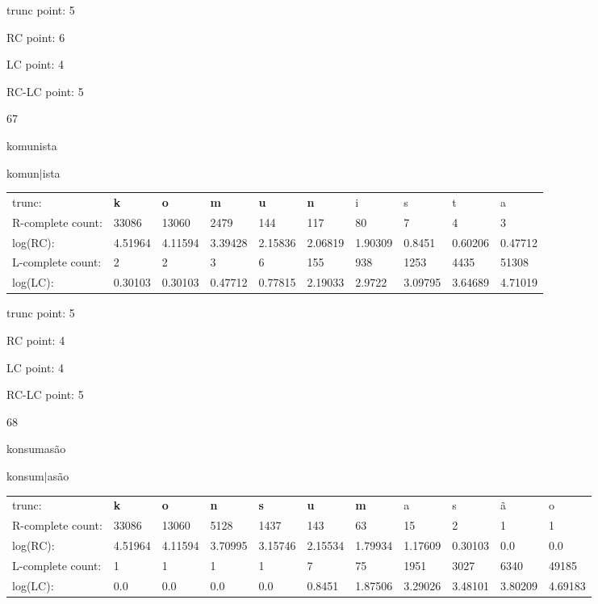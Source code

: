 \documentclass{article}
\begin{document}
trunc point: 5

RC point: 6

LC point: 4

RC-LC point: 5

\vspace{3em}



67

komunista

komun$|$ista

\vspace{1em}

\begin{tabular}{l|lllllllll}

trunc: & {\color{red}\bf k} & {\color{red}\bf o} & {\color{red}\bf m} & {\color{red}\bf u} & {\color{red}\bf n} & i & s & t & a \\ 
R-complete count: & 33086 & 13060 & 2479 & 144 & 117 & 80 & 7 & 4 & 3 \\ 
log(RC): & 4.51964 & 4.11594 & 3.39428 & 2.15836 & 2.06819 & 1.90309 & 0.8451 & 0.60206 & 0.47712 \\ 
L-complete count: & 2 & 2 & 3 & 6 & 155 & 938 & 1253 & 4435 & 51308 \\ 
log(LC): & 0.30103 & 0.30103 & 0.47712 & 0.77815 & 2.19033 & 2.9722 & 3.09795 & 3.64689 & 4.71019 \\ 
\end{tabular}

trunc point: 5

RC point: 4

LC point: 4

RC-LC point: 5

\vspace{3em}



68

konsumasão

konsum$|$asão

\vspace{1em}

\begin{tabular}{l|llllllllll}

trunc: & {\color{red}\bf k} & {\color{red}\bf o} & {\color{red}\bf n} & {\color{red}\bf s} & {\color{red}\bf u} & {\color{red}\bf m} & a & s & ã & o \\ 
R-complete count: & 33086 & 13060 & 5128 & 1437 & 143 & 63 & 15 & 2 & 1 & 1 \\ 
log(RC): & 4.51964 & 4.11594 & 3.70995 & 3.15746 & 2.15534 & 1.79934 & 1.17609 & 0.30103 & 0.0 & 0.0 \\ 
L-complete count: & 1 & 1 & 1 & 1 & 7 & 75 & 1951 & 3027 & 6340 & 49185 \\ 
log(LC): & 0.0 & 0.0 & 0.0 & 0.0 & 0.8451 & 1.87506 & 3.29026 & 3.48101 & 3.80209 & 4.69183 \\ 
\end{tabular}
\end{document}
